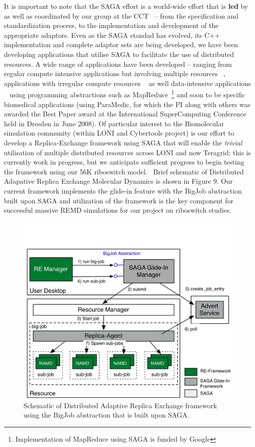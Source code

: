 \documentclass[a4paper,10pt]{article}
\begin{document}
It is important to note that the SAGA effort is a world-wide effort that is {\bf led} by as well as coordinated by our group at the CCT~\cite{saga_url} -- from the specification and standardization process, to the implementation and development of the appropriate adaptors.  Even as the SAGA standad has evolved, its C++ implementation and complete adaptor sets are being developed, we have been developing applications that utilise SAGA to facilitate the use of distributed resources.  A wide range of applications have been developed -- ranging from regular compute intensive applications but involving multiple resources ~\cite{saga_escience07}, applications with irregular compute resources ~\cite{teragrid08} as well data-intensive applications ~\cite{sagamapreduce} using programming abstractions such as MapReduce~\footnote{Implementation of MapReduce using SAGA is funded by Google} and soon to be specific biomedical applications (using ParaMedic, for which the PI along with others was awarded the Best Paper award at the International SuperComputing Conference held in Dresden in June 2008). Of particular interest to the Biomolecular simulation community (within LONI and Cybertools project) is our effort to develop a Replica-Exchange framework using SAGA that will enable the {\it trivial} utilisation of multiple distributed resources across LONI and now Teragrid; this is currently work in progress, but we anticipate sufficient progress to begin testing the framework using our 56K riboswitch model.~\cite{REMD-PhilTranA2009} Brief schematic of Distributed Adapative Replica Exchange Molecular Dynamics is shown in Figure 9.  Our current framework implements the glide-in feature with the BigJob abstraction built upon SAGA and utilization of the framework is the key component for successful massive REMD simulations for our project on riboswitch studies.

\begin{figure}
\begin{center}
\includegraphics[scale=0.65]{DARE-MD}
\end{center}
\caption{Schematic of Distributed Adaptive Replica Exchange framework using the BigJob abstraction that is built upon SAGA.}
\label{fig:results}
\end{figure}
\end{document}
